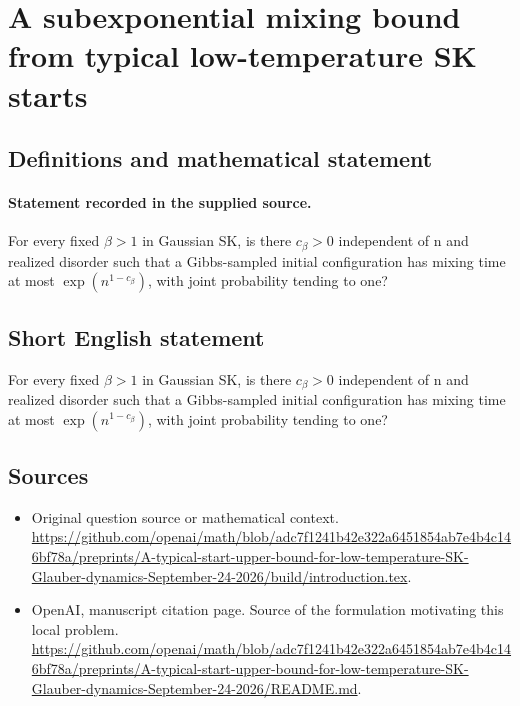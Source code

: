 \documentclass[11pt]{article}
\begin{document}
\section*{A subexponential mixing bound from typical low-temperature SK starts}\label{statement}
\subsection{Definitions and mathematical statement}
\paragraph{Statement recorded in the supplied source.}
For every fixed $\beta >1$ in Gaussian SK, is there $c_\beta >0$ independent of n and realized disorder such that a Gibbs-sampled initial configuration has mixing time at most $\exp (n^{1-c_\beta })$, with joint probability tending to one?
\subsection{Short English statement}
For every fixed $\beta >1$ in Gaussian SK, is there $c_\beta >0$ independent of n and realized disorder such that a Gibbs-sampled initial configuration has mixing time at most $\exp (n^{1-c_\beta })$, with joint probability tending to one?
\subsection{Sources}
\begin{itemize}
\item[S1] Original question source or mathematical context.
\url{https://github.com/openai/math/blob/adc7f1241b42e322a6451854ab7e4b4c146bf78a/preprints/A-typical-start-upper-bound-for-low-temperature-SK-Glauber-dynamics-September-24-2026/build/introduction.tex}.
\item[S2] OpenAI, manuscript citation page. Source of the formulation motivating this local problem.
\url{https://github.com/openai/math/blob/adc7f1241b42e322a6451854ab7e4b4c146bf78a/preprints/A-typical-start-upper-bound-for-low-temperature-SK-Glauber-dynamics-September-24-2026/README.md}.
\end{itemize}
\end{document}
